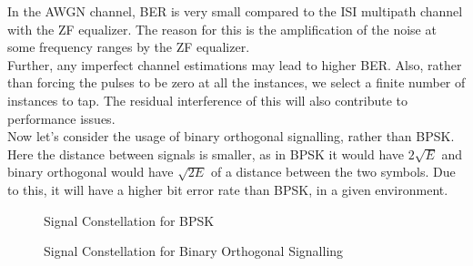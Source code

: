 \documentclass{article}
\begin{document}
        In the AWGN channel, BER is very small compared to the ISI multipath channel with the ZF equalizer. The reason for this is the amplification of the noise at some frequency ranges by the ZF equalizer.\cite{art2}\\

        Further, any imperfect channel estimations may lead to higher BER. Also, rather than forcing the pulses to be zero at all the instances, we select a finite number of instances to tap. The residual interference of this will also contribute to performance issues.\cite{art3}\\

        \newpage
        Now let's consider the usage of binary orthogonal signalling, rather than BPSK. Here the distance between signals is smaller, as in BPSK it would have \(2\sqrt{E}\) and binary orthogonal would have \(\sqrt{2E}\) of a distance between the two symbols. Due to this, it will have a higher bit error rate than BPSK, in a given environment.\cite{art1}

        \begin{figure}[!htb]
                \centering
                \caption {Signal Constellation for BPSK}
        \end{figure}

        \begin{figure}[!htb]
                \centering
                \caption{Signal Constellation for Binary Orthogonal Signalling}
        \end{figure}
\end{document}
